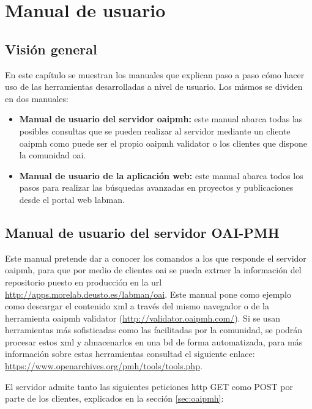 \chapter{Manual de usuario}

\section{Visión general}

En este capítulo se muestran los manuales que explican paso a paso cómo hacer uso de las herramientas desarrolladas a nivel de usuario. Los mismos se dividen en dos manuales:

\begin{itemize}
	\item \textbf{Manual de usuario del servidor \acrshort{oaipmh}:} este manual abarca todas las posibles consultas que se pueden realizar al servidor mediante un cliente \acrshort{oaipmh} como puede ser el propio \acrshort{oaipmh} validator o los clientes que dispone la comunidad \acrshort{oai}.
	\item \textbf{Manual de usuario de la aplicación web:} este manual abarca todos los pasos para realizar las búsquedas avanzadas en proyectos y publicaciones desde el portal web \acrshort{labman}.
\end{itemize}

\section{Manual de usuario del servidor OAI-PMH}

Este manual pretende dar a conocer los comandos a los que responde el servidor \acrshort{oaipmh}, para que por medio de clientes \acrshort{oai} se pueda extraer la información del repositorio puesto en producción en la \acrshort{url} \url{http://apps.morelab.deusto.es/labman/oai}. Este manual pone como ejemplo como descargar el contenido \acrshort{xml} a través del mismo navegador o de la herramienta \acrshort{oaipmh} validator (\url{http://validator.oaipmh.com/}). Si se usan herramientas más sofisticadas como las facilitadas por la comunidad, se podrán procesar estos \acrshort{xml} y almacenarlos en una \acrshort{bd} de forma automatizada, para más información sobre estas herramientas consultad el siguiente enlace: \url{https://www.openarchives.org/pmh/tools/tools.php}.

El servidor admite tanto las siguientes peticiones \acrshort{http} GET como POST por parte de los clientes, explicados en la sección \ref{sec:oaipmh}:

